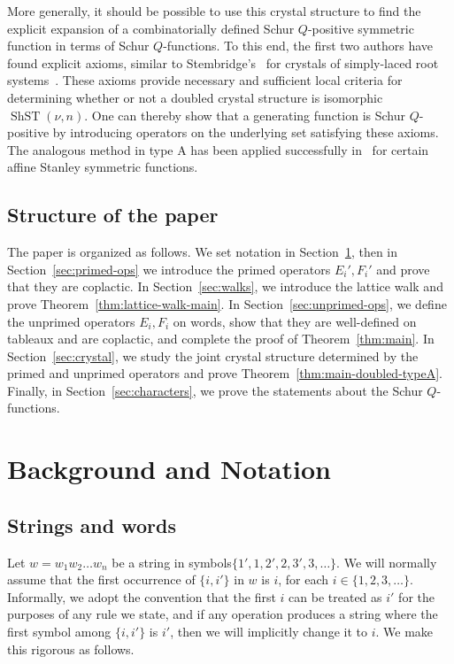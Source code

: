 \documentclass[ALCO,ThmDefs,Unicode,epreuves]{cedram}
\DeclareMathOperator{\ShST}{ShST}
\begin{document}
More generally, it should be possible to use this crystal structure to find the explicit expansion of a combinatorially defined Schur $Q$-positive symmetric function in terms of Schur $Q$-functions. To this end, the first two authors have found explicit axioms, similar to Stembridge's~\cite{Stembridge-typeA} for crystals of simply-laced root systems~\cite{GL-axioms}. These axioms provide necessary and sufficient local criteria for determining whether or not a doubled crystal structure is isomorphic $\ShST(\nu,n)$. One can thereby show that a generating function is Schur $Q$-positive by introducing operators on the underlying set satisfying these axioms. The analogous method in type A has been applied successfully in~\cite{Morse-Schilling} for certain affine Stanley symmetric functions.

\subsection{Structure of the paper}
The paper is organized as follows. We set notation in Section~\ref{sec:notation}, then in Section~\ref{sec:primed-ops} we introduce the primed operators $E_i',F_i'$ and prove that they are coplactic. In Section~\ref{sec:walks}, we introduce the lattice walk and prove Theorem~\ref{thm:lattice-walk-main}. In Section~\ref{sec:unprimed-ops}, we define the unprimed operators $E_i,F_i$ on words, show that they are well-defined on tableaux and are coplactic, and complete the proof of Theorem~\ref{thm:main}. In Section~\ref{sec:crystal}, we study the joint crystal structure determined by the primed and unprimed operators and prove Theorem~\ref{thm:main-doubled-typeA}. Finally, in Section~\ref{sec:characters}, we prove the statements about the Schur $Q$-functions. 



\section{Background and Notation}\label{sec:notation}

\subsection{Strings and words}

Let $w = w_1w_2 \dots w_n$ be a string in symbols\break $\{1',1,2',2,3',3,\ldots\}$. We will normally assume that the first occurrence of $\{i,i'\}$ in $w$ is $i$, for each $i\in \{1,2,3,\ldots\}$. Informally, we adopt the convention that the first $i$ can be treated as $i'$ for the purposes of any rule we state, and if any operation produces a string where the first symbol among $\{i,i'\}$ is $i'$, then we will implicitly change it to $i$. We make this rigorous as follows.
\end{document}
